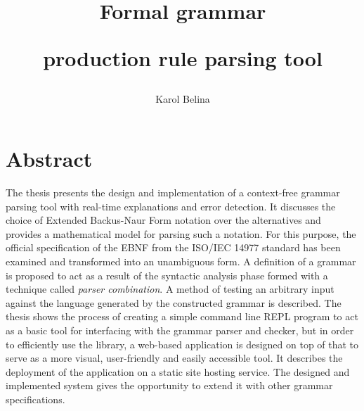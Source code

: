 \documentclass[english,engineering]{wizthesis}
\author{Karol Belina}
\title{Formal grammar\par production rule parsing tool}
\begin{document}
\frontmatter %

\maketitle

\chapter*{Abstract}

The thesis presents the design and implementation of a context-free grammar
parsing tool with real-time explanations and error detection. It discusses the
choice of Extended Backus-Naur Form notation over the alternatives and provides
a mathematical model for parsing such a notation. For this purpose, the official
specification of the EBNF from the ISO/IEC 14977 standard has been examined and
transformed into an unambiguous form. A definition of a grammar is proposed to
act as a result of the syntactic analysis phase formed with a technique called
\emph{parser combination}. A method of testing an arbitrary input against the
language generated by the constructed grammar is described. The thesis shows the
process of creating a simple command line REPL program to act as a basic tool
for interfacing with the grammar parser and checker, but in order to efficiently
use the library, a web-based application is designed on top of that to serve as
a more visual, user-friendly and easily accessible tool. It describes the
deployment of the application on a static site hosting service. The designed and
implemented system gives the opportunity to extend it with other grammar
specifications.
\end{document}
